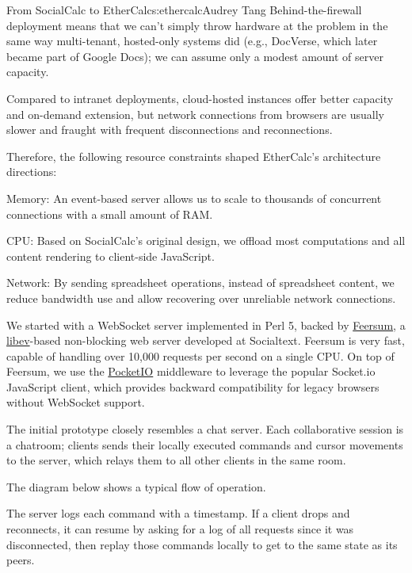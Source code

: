 \begin{aosachapter}{From SocialCalc to EtherCalc}{s:ethercalc}{Audrey Tang}
Behind-the-firewall deployment means that we can't simply throw hardware
at the problem in the same way multi-tenant, hosted-only systems did
(e.g., DocVerse, which later became part of Google Docs); we can assume
only a modest amount of server capacity.

Compared to intranet deployments, cloud-hosted instances offer better
capacity and on-demand extension, but network connections from browsers
are usually slower and fraught with frequent disconnections and
reconnections.

Therefore, the following resource constraints shaped EtherCalc's
architecture directions:

\begin{aosadescription}
\item[Memory:]
An event-based server allows us to scale to thousands of concurrent
connections with a small amount of RAM.
\item[CPU:]
Based on SocialCalc's original design, we offload most computations and
all content rendering to client-side JavaScript.
\item[Network:]
By sending spreadsheet operations, instead of spreadsheet content, we
reduce bandwidth use and allow recovering over unreliable network
connections.
\end{aosadescription}


We started with a WebSocket server implemented in Perl 5, backed by
\href{https://metacpan.org/release/Feersum}{Feersum}, a
\href{http://software.schmorp.de/pkg/libev.html}{libev}-based
non-blocking web server developed at Socialtext. Feersum is very fast,
capable of handling over 10,000 requests per second on a single CPU. On
top of Feersum, we use the
\href{https://metacpan.org/release/PocketIO}{PocketIO} middleware to
leverage the popular Socket.io JavaScript client, which provides
backward compatibility for legacy browsers without WebSocket support.

The initial prototype closely resembles a chat server. Each
collaborative session is a chatroom; clients sends their locally
executed commands and cursor movements to the server, which relays them
to all other clients in the same room.

The diagram below shows a typical flow of operation.


The server logs each command with a timestamp. If a client drops and
reconnects, it can resume by asking for a log of all requests since it
was disconnected, then replay those commands locally to get to the same
state as its peers.


\end{aosachapter}
